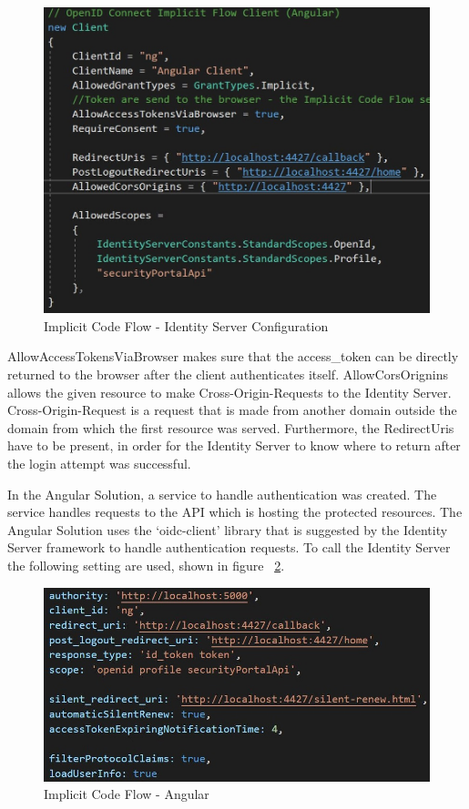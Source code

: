 \begin{figure}[h]
	\centering
	\includegraphics[width=0.8\linewidth]{images/implicit_code_flow}
	\caption{Implicit Code Flow - Identity Server Configuration}
	\label{fig:implicitcodeflow}
\end{figure}


AllowAccessTokensViaBrowser makes sure that the access\_token can be directly returned to the browser after the client authenticates itself. AllowCorsOrignins allows the given resource to make Cross-Origin-Requests to the Identity Server. Cross-Origin-Request is a request that is made from another domain outside the domain from which the first resource was served. Furthermore, the RedirectUris have to be present, in order for the Identity Server to know where to return after the login attempt was successful. 


In the Angular Solution, a service to handle authentication was created. The service handles requests to the API which is hosting the protected resources. The Angular Solution uses the ‘oidc-client’ library that is suggested by the Identity Server framework to handle authentication requests. To call the Identity Server the following setting are used, shown in figure~ \ref{fig:implicitcodeflowangular}.

\begin{figure}[h]
	\centering
	\includegraphics[width=0.8\linewidth]{images/implicit_code_flow_angular}
	\caption{Implicit Code Flow - Angular}
	\label{fig:implicitcodeflowangular}
\end{figure}


